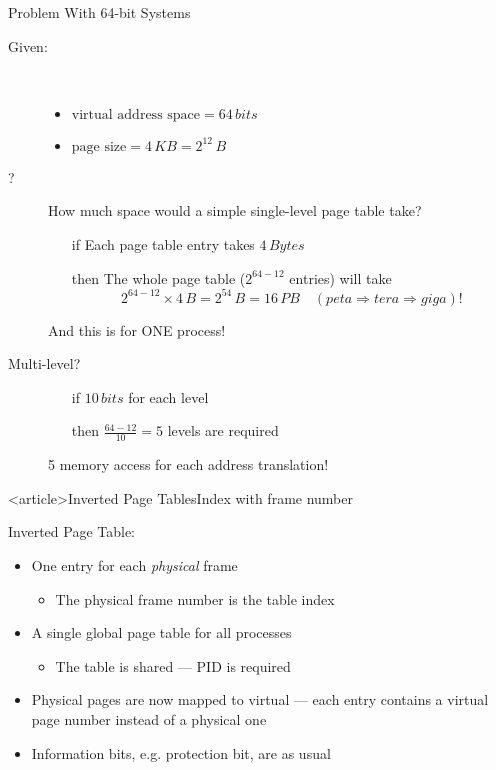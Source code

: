 \begin{frame}{Problem With 64-bit Systems}
  \begin{description}
  \item[Given:]\hfill\\[-2ex]
    \begin{itemize}
    \item $\text{virtual address space} = 64\,bits$
    \item $\text{page size}=4\,KB=2^{12}\,B$
    \end{itemize}
  \item[?] How much space would a simple single-level page table take?
    \begin{itemize}
    \item[if] Each page table entry takes $4\,Bytes$
    \item[then] The whole page table ($2^{64-12}$ entries) will take
      \[2^{64-12}\times{}4\,B=2^{54}\,B=16\,PB \quad {\scriptstyle(peta \Rightarrow tera \Rightarrow giga)!}\]
    \end{itemize}
    And this is for ONE process!
  \item[Multi-level?]\hfill
    \begin{itemize}
    \item[if] $10\,bits$ for each level
    \item[then] $\frac{64-12}{10}=5$ levels are required
    \end{itemize}
    5 memory access for each address translation!
  \end{description}
\end{frame}

\begin{frame}<article>{Inverted Page Tables}{Index with frame number}
  \begin{iblock}{Inverted Page Table:}
    \begin{itemize}
    \item One entry for each \emph{physical} frame
      \begin{itemize}
      \item The physical frame number is the table index
      \end{itemize}
    \item A single global page table for all processes
      \begin{itemize}
      \item The table is shared --- PID is required
      \end{itemize}
    \end{itemize}
  \end{iblock}
  \begin{itemize}
  \item Physical pages are now mapped to virtual --- each entry contains a virtual page
    number instead of a physical one
  \item Information bits, e.g. protection bit, are as usual
  \end{itemize}
\end{frame}

